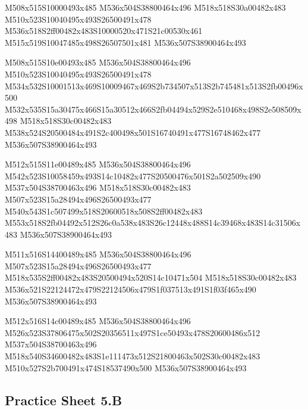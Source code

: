 \documentclass{article}
\begin{document}
\begin{multicols}{5}
\begin{center}

M508x515S10000493x485 %
M536x504S38800464x496 %
M518x518S30a00482x483 %
M510x523S10040495x493S26500491x478 %
M536x518S2ff00482x483S10000520x471S21c00530x461 %
M515x519S10047485x498S26507501x481 %
M536x507S38900464x493 %
\vfil
\columnbreak

M508x515S10e00493x485 %
M536x504S38800464x496 %
M510x523S10040495x493S26500491x478 %
M534x532S10001513x469S10009467x469S2b734507x513S2b745481x513S2fb00496x500 %
M532x535S15a30475x466S15a30512x466S2fb04494x529S2e510468x498S2e508509x498 %
M518x518S30c00482x483 %
M538x524S20500484x491S2c400498x501S16740491x477S16748462x477 %
M536x507S38900464x493 %
\vfil
\columnbreak

M512x515S11e00489x485 %
M536x504S38800464x496 %
M542x523S10058459x493S14c10482x477S20500476x501S2a502509x490 %
M537x504S38700463x496 %
M518x518S30c00482x483 %
M507x523S15a28494x496S26500493x477 %
M540x543S1c507499x518S20600518x508S2ff00482x483 %
M553x518S2fb04492x512S26c0a538x483S26c12448x488S14c39468x483S14c31506x483 %
M536x507S38900464x493 %
\vfil
\columnbreak

M511x516S14400489x485 %
M536x504S38800464x496 %
M507x523S15a28494x496S26500493x477 %
M518x535S2ff00482x483S20500494x520S14c10471x504 %
M518x518S30c00482x483 %
M536x521S22124472x479S22124506x479S1f037513x491S1f03f465x490 %
M536x507S38900464x493 %
\vfil
\columnbreak

M512x516S14c00489x485 %
M536x504S38800464x496 %
M526x523S37806475x502S20356511x497S1ce50493x478S20600486x512 %
M537x504S38700463x496 %
M518x540S34600482x483S1e111473x512S21800463x502S30c00482x483 %
M510x527S2b700491x474S18537490x500 %
M536x507S38900464x493 %
\vfil

\end{center}
\end{multicols}

\subsection{Practice Sheet 5.B}
\end{document}

